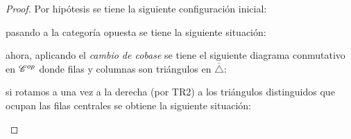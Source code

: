 \documentclass{article}
\begin{document}
	\begin{proof}
		Por hipótesis se tiene la siguiente configuración inicial:
		
		\begin{center}
		\end{center}
		
		pasando a la categoría opuesta se tiene la siguiente situación:
		
		\begin{center}
		\end{center}
		
		ahora, aplicando el \emph{cambio de cobase} se tiene el siguiente diagrama conmutativo en $\mathscr{C}^{op}$ donde filas y columnas son triángulos en $\overline{\triangle}$:
		
		\begin{center}
		\end{center}
		
		si rotamos a una vez a la derecha (por TR2) a los triángulos distinguidos que ocupan las filas centrales se obtiene la siguiente situaci\'on:
		
		\begin{center}
		\end{center}
		

\end{proof}
\end{document}
